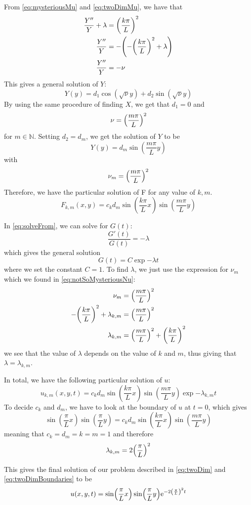 From \vref{eq:mysteriousMu} and \vref{eq:twoDimMu}, we have that
\begin{align*}
\frac{Y''}{Y} +\lambda  &=\qty(\frac{k\pi}{L})^2 \\
\frac{Y''}{Y}&=-\qty(-\qty(\frac{k\pi}{L})^2 + \lambda ) \\
\frac{Y''}{Y}&=-\nu
\end{align*}
This gives a general solution of \(Y\):
\[
Y(y) = d_1\cos(\sqrt{\nu}y) + d_2\sin(\sqrt{\nu}y)
\]
By using the same procedure of finding \(X\), we get that \(d_1 = 0\) and
\[
\nu = \qty(\frac{m\pi}{L})^2
\]
for \(m \in \mathbb{N}\). Setting \(d_2 = d_m\), we get the solution of \(Y\) to be
\[
Y(y) = d_m\sin(\frac{m\pi}{L}y)
\]
with
\begin{equation}\label{eq:notSoMysteriousNu}
\nu_m = \qty(\frac{m\pi}{L})^2
\end{equation}
Therefore, we have the particular solution of F for any value of \(k,m\).
\[
F_{k,m}(x,y) = c_kd_m\sin(\frac{k\pi}{L}x)\sin(\frac{m\pi}{L}y)
\]

In \vref{eq:solveFrom}, we can solve for \(G(t)\):
\[
\frac{G'(t)}{G(t)}  = -\lambda
\]
which gives the general solution
\[
G(t) = C\exp{-\lambda t}
\]
where we set the constant \(C = 1\). To find \(\lambda\), we just use the expression for \(\nu_m\) which we found in \vref{eq:notSoMysteriousNu}:
\begin{align*}
\nu_m &= \qty(\frac{m\pi}{L})^2 \\
-\qty(\frac{k\pi}{L})^2 + \lambda_{k,m} &= \qty(\frac{m\pi}{L})^2  \\
\lambda_{k,m} &= \qty(\frac{m\pi}{L})^2+\qty(\frac{k\pi}{L})^2
\end{align*}
we see that the value of \(\lambda \) depends on the value of \(k\) and \(m\), thus giving that \(\lambda = \lambda_{k,m}\).

In total, we have the following particular solution of \(u\):
\[
u_{k,m}(x,y,t) =  c_kd_m\sin(\frac{k\pi}{L}x)\sin(\frac{m\pi}{L}y)\exp{-\lambda_{k,m} t}
\]
To decide \(c_k\) and \(d_m\), we have to look at the boundary of \(u\) at \(t = 0\), which gives
\[
\sin(\frac{\pi}{L}x)\sin(\frac{\pi}{L}y) =  c_kd_m\sin(\frac{k\pi}{L}x)\sin(\frac{m\pi}{L}y)
\]
meaning that \(c_k = d_m = k = m = 1\) and therefore
\[
\lambda_{k,m} = 2\qty(\frac{\pi}{L})^2
\]

This gives the final solution of our problem described in \vref{eq:twoDim} and \vref{eq:twoDimBoundaries} to be
\[
u(x,y,t) = \sin(\frac{\pi}{L}x)\sin(\frac{\pi}{L}y)\mathrm{e}^{-2\qty(\frac{\pi}{L})^2 t}
\]
